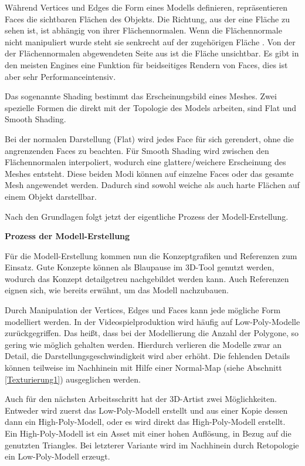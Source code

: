 \par
Während Vertices und Edges die Form eines Modells definieren, repräsentieren Faces die sichtbaren Flächen des Objekts. Die Richtung, aus der eine Fläche zu sehen ist, ist abhängig von ihrer Flächennormalen. Wenn die Flächennormale nicht manipuliert wurde steht sie senkrecht auf der zugehörigen Fläche \parencite[S.88]{blender}.
\enlargethispage{14pt}
\newpage
Von der der Flächennormalen abgewendeten Seite aus ist die Fläche unsichtbar. Es gibt in den meisten Engines eine Funktion für beidseitiges Rendern von Faces, dies ist aber sehr Performanceintensiv.
\par
Das sogenannte Shading bestimmt das Erscheinungsbild eines Meshes. Zwei spezielle Formen die direkt mit der Topologie des Models arbeiten, sind Flat und Smooth Shading.
\par
Bei der normalen Darstellung (Flat) wird jedes Face für sich gerendert, ohne die angrenzenden Faces zu beachten. Für Smooth Shading wird zwischen den Flächennormalen interpoliert, wodurch eine glattere/weichere Erscheinung des Meshes entsteht. Diese beiden Modi können auf einzelne Faces oder das gesamte Mesh angewendet werden. Dadurch sind sowohl weiche als auch harte Flächen auf einem Objekt darstellbar. \parencite[S.\,388-394]{blender}
\par
Nach den Grundlagen folgt jetzt der eigentliche Prozess der Modell-Erstellung.
\par
\textbf{Prozess der Modell-Erstellung}
\par
Für die Modell-Erstellung kommen nun die Konzeptgrafiken und Referenzen zum Einsatz. Gute Konzepte können als Blaupause im 3D-Tool genutzt werden, wodurch das Konzept detailgetreu nachgebildet werden kann. Auch Referenzen eignen sich, wie bereits erwähnt, um das Modell nachzubauen.
\par
Durch Manipulation der Vertices, Edges und Faces kann jede mögliche Form modelliert werden. In der Videospielproduktion wird häufig auf Low-Poly-Modelle zurückgegriffen. Das heißt, dass bei der Modellierung die Anzahl der Polygone, so gering wie möglich gehalten werden. Hierdurch verlieren die Modelle zwar an Detail, die Darstellungsgeschwindigkeit wird aber erhöht. Die fehlenden Details können teilweise im Nachhinein mit Hilfe einer Normal-Map (siehe Abschnitt \ref{Texturierung1}) ausgeglichen werden.
\par
Auch für den nächsten Arbeitsschritt hat der 3D-Artist zwei Möglichkeiten. Entweder wird zuerst das Low-Poly-Modell erstellt und aus einer Kopie dessen dann ein High-Poly-Modell, oder es wird direkt das High-Poly-Modell erstellt. Ein High-Poly-Modell ist ein Asset mit einer hohen Auflösung, in Bezug auf die genutzten Triangles. Bei letzterer Variante wird im Nachhinein durch Retopologie ein Low-Poly-Modell erzeugt.
